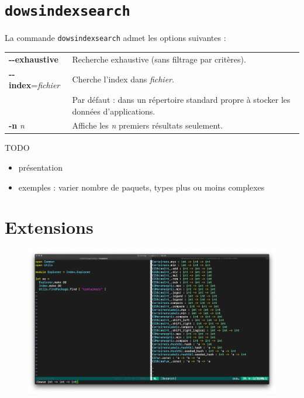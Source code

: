 \documentclass[a4paper]{report}
\theoremstyle{definition}
\newcommand{\dowsindex}{\texttt{dowsindex}\xspace}
\begin{document}
\section{\dowsindex \texttt{search}}

La commande \dowsindex \texttt{search} admet les options suivantes :

\begin{table}[h]
\begin{tabular}{ll}
		\textbf{-{}-exhaustive} &
		Recherche exhaustive (sans filtrage par critères).
	\\
		\textbf{-{}-index}=\textit{fichier} &
		Cherche l'index dans \textit{fichier}. \\ &
		Par défaut : dans un répertoire standard propre à stocker les données d'applications.
	\\
		\textbf{-n} \textit{n} &
		Affiche les \textit{n} premiers résultats seulement.
\end{tabular}
\end{table}

TODO
\begin{itemize}
	\item présentation
	\item exemples : varier nombre de paquets, types plus ou moins complexes
\end{itemize}


\section{Extensions}

\begin{figure}[h]
\begin{center}
	\includegraphics[scale=0.15]{images/vim_plugin}
\end{center}
\end{figure}
\end{document}
